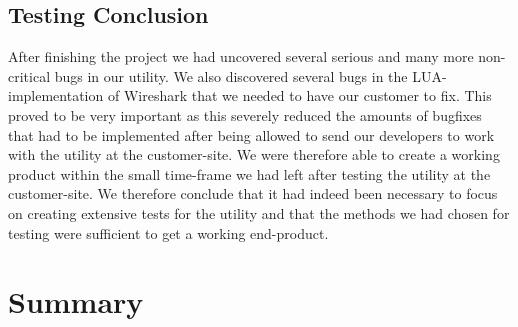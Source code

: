 \subsection{Testing Conclusion}
After finishing the project we had uncovered several serious and many more non-critical bugs in our utility. We also discovered several bugs in the LUA-implementation of Wireshark that we needed to have our customer to fix. This proved to be very important as this severely reduced the amounts of bugfixes that had to be implemented after being allowed to send our developers to work with the utility at the customer-site. We were therefore able to create a working product within the small time-frame we had left after testing the utility at the customer-site. We therefore conclude that it had indeed been necessary to focus on creating extensive tests for the utility and that the methods we had chosen for testing were sufficient to get a working end-product.




\section{Summary}

